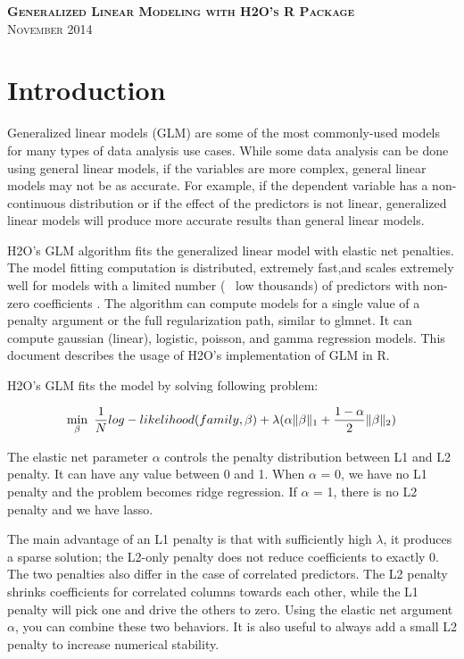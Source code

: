 \documentclass[11pt]{article}
\begin{document}
\thispagestyle{empty} %

\begin{center}
\textsc{\Large\bf{Generalized Linear Modeling  with H2O's R Package}}
\\
\bigskip
\textsc{November 2014}
\end{center}
\bigskip
\bigskip 
\bigskip
\bigskip
\tableofcontents

\newpage


\section{Introduction} \label{1}

Generalized linear models (GLM) are some of the most commonly-used models for many types of data analysis use cases. While some data analysis can be done using general linear models, if the variables are more complex, general linear models may not be as accurate. For example, if the dependent variable has a non-continuous distribution or if the effect of the predictors is not linear, generalized linear models will produce more accurate results than general linear models.  

H2O's GLM algorithm fits the generalized linear model with elastic net penalties. The model fitting computation is distributed, extremely fast,and scales extremely well for models with a limited number (~ low thousands) of predictors with non-zero coefficients . The algorithm can compute models for a single value of a penalty argument or the full regularization path, similar to glmnet. It can compute gaussian (linear), logistic, poisson, and gamma regression models. This document describes the usage of H2O's implementation of GLM in R.

H2O's GLM fits the model by solving following problem:

\[ \min\limits_{\beta}\ {{1\over{N}} log-likelihood(family,\beta)  + \lambda (\alpha \| \beta \|_1}  + {1- \alpha \over 2} \| \beta \|_2) \]

The elastic net parameter $\alpha$ controls the penalty distribution between L1 and L2 penalty. It can have any value between 0 and 1. When $\alpha$ = 0, we have no L1 penalty and the problem becomes ridge regression. If $\alpha$ = 1, there is no L2 penalty and we have lasso.

The main advantage of an L1 penalty is that with sufficiently high $\lambda$, it produces a sparse solution; the L2-only penalty does not reduce coefficients to exactly 0. The two penalties also differ in the case of correlated predictors. The L2 penalty shrinks coefficients for correlated columns towards each other, while the L1 penalty will pick one and drive the others to zero. Using the elastic net argument $\alpha$, you can combine these two behaviors. It is also useful to always add a small L2 penalty to increase numerical stability.
\end{document}
